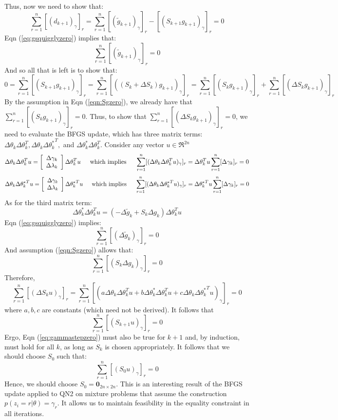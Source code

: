 \documentclass[letter,12pt]{article}
\begin{document}
Thus, now we need to show that:
\begin{equation} \label{eq:dpluszero}
\sum_{r=1}^{n} [(d_{k+1})_{\gamma}]_r
=
\sum_{r=1}^{n} [(\tilde{g}_{k+1})_{\gamma}]_r - [(S_{k+1}g_{k+1})_{\gamma}]_r = 0
\end{equation}
Eqn (\ref{eq:gsquigglyzero}) implies that:
\[
\sum_{r=1}^{n} [(\tilde{g}_{k+1})_{\gamma}]_r = 0
\]
And so all that is left is to show that:
\[
0 = \sum_{r=1}^{n} [(S_{k+1}g_{k+1})_{\gamma}]_r 
= \sum_{r=1}^{n} [((S_{k}+\Delta S_k)g_{k+1})_{\gamma}]_r
=\sum_{r=1}^{n} [(S_{k}g_{k+1})_{\gamma}]_r
+\sum_{r=1}^{n} [(\Delta S_kg_{k+1})_{\gamma}]_r
\]
By the assumption in Eqn (\ref{eqn:Sgzero}), we already have that $\sum_{r=1}^{n} [(S_{k}g_{k+1})_{\gamma}]_r=0$.  Thus, to show that $\sum_{r=1}^{n} [(\Delta S_kg_{k+1})_{\gamma}]_r=0$, we need to evaluate the BFGS update, which has three matrix terms: $\Delta \theta_k \Delta \theta_k^T, \Delta \theta_k \Delta {\theta_k^*}^T,$ and $\Delta \theta_k^* \Delta \theta_k^T$.  Consider any vector $u \in \Re^{2n}$
\[
\Delta \theta_k\Delta \theta_k^Tu = 
\left[
\begin{array}{cc}
\Delta \gamma_k 
\\
\Delta \lambda_k 
\end{array}
\right]
\Delta \theta_k^Tu
\indent
\text{which implies}
\indent
\sum_{r=1}^{n} [(\Delta \theta_k\Delta \theta_k^Tu)_{\gamma}]_r 
=
\Delta \theta_k^Tu\sum_{r=1}^{n} [\Delta \gamma_k]_r
= 0
\]
\[
\Delta \theta_k \Delta {\theta_k^*}^Tu
=
\left[
\begin{array}{cc}
\Delta \gamma_k 
\\
\Delta \lambda_k 
\end{array}
\right]
\Delta {\theta_k^*}^Tu
\indent
\text{which implies}
\indent
\sum_{r=1}^{n} [(\Delta \theta_k\Delta {\theta_k^*}^Tu)_{\gamma}]_r 
=
\Delta {\theta_k^*}^Tu\sum_{r=1}^{n} [\Delta \gamma_k]_r
= 0
\]
As for the third matrix term:
\[
\Delta \theta_k^* \Delta \theta_k^Tu
=
(-\Delta\tilde{g}_k + S_k\Delta g_k)\Delta \theta_k^Tu
\]
Eqn (\ref{eq:gsquigglyzero}) implies:
\[
\sum_{r=1}^{n}[(\Delta\tilde{g}_k)_{\gamma}]_r = 0
\]
And assumption (\ref{eqn:Sgzero}) allows that:
\[
\sum_{r=1}^{n}[(S_k\Delta g_k)_{\gamma}]_r = 0
\]
Therefore,
\begin{equation} \label{eq:Suzero}
\sum_{r=1}^{n}[(\Delta S_ku)_{\gamma}]_r 
= \sum_{r=1}^{n}[(a\Delta \theta_k\Delta \theta_k^Tu + b\Delta \theta_k^* \Delta \theta_k^Tu + c\Delta \theta_k \Delta {\theta_k^*}^Tu)_{\gamma}]_r
= 0
\end{equation}
where $a,b,c$ are constants (which need not be derived).  It follows that
\[
\sum_{r=1}^{n}[(S_{k+1}u)_{\gamma}]_r = 0
\]
Ergo, Eqn (\ref{eq:gammastepzero}) must also be true for $k+1$ and, by induction, must hold for all $k$, as long as $S_k$ is chosen appropriately.  It follows that we should choose $S_0$ such that:
\[
\sum_{r=1}^{n}[(S_{0}u)_{\gamma}]_r = 0
\]
Hence, we should choose $S_0 = \boldsymbol{0}_{2n \times 2n}$.  This is an interesting result of the BFGS update applied to QN2 on mixture problems that assume the construction $p(z_i=r|\theta)=\gamma_r$.  It allows us to maintain feasibility in the equality constraint in all iterations.  
\end{document}
